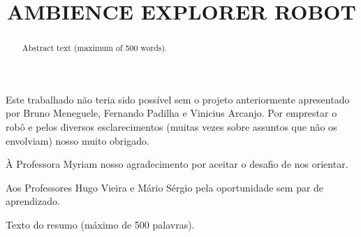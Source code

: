 \documentclass[oneside]{normas-utf-tex} %
\title{\MakeUppercase{Ambience Explorer Robot}} %
\begin{document}
\capa %
\folhaderosto %


\begin{agradecimentos}
Este trabalhado não teria sido possível sem o projeto anteriormente apresentado por Bruno Meneguele, Fernando Padilha e Vinicius Arcanjo.
Por emprestar o robô e pelos diversos esclarecimentos (muitas vezes sobre assuntos que não os envolviam) nosso muito obrigado.

À Professora Myriam nosso agradecimento por aceitar o desafio de nos orientar. 

Aos Professores Hugo Vieira e Mário Sérgio pela oportunidade sem par de aprendizado.
 
\end{agradecimentos}


\begin{resumo}
Texto do resumo (m\'aximo de 500 palavras).
\end{resumo}

\begin{abstract}
Abstract text (maximum of 500 words).
\end{abstract}

\listadefiguras %
\listadetabelas %

\sumario %


%
%
%
%


\end{document}
